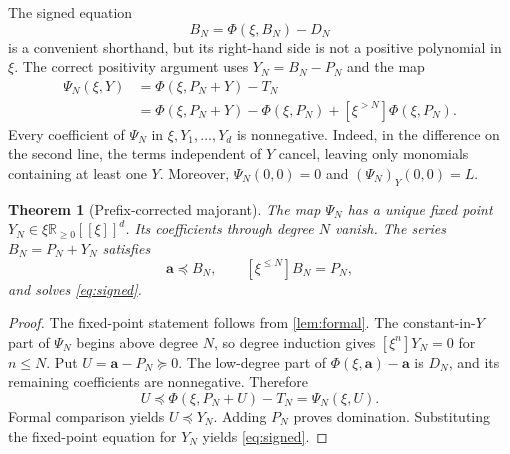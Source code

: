 \documentclass[11pt,a4paper]{article}
\newtheorem{theorem}{Theorem}[section]
\theoremstyle{definition}
\theoremstyle{remark}
\newcommand{\R}{\mathbb R}
\newcommand{\bA}{\boldsymbol a}
\newcommand{\trunc}[2]{[\xi^{\leq #1}]#2}
\newcommand{\tail}[2]{[\xi^{>#1}]#2}
\begin{document}
The signed equation
\begin{equation}\label{eq:signed}
 B_N=\Phi(\xi,B_N)-D_N
\end{equation}
is a convenient shorthand, but its right-hand side is not a positive
polynomial in $\xi$. The correct positivity argument uses $Y_N=B_N-P_N$
and the map
\begin{equation}\label{eq:psi}
\begin{split}
 \Psi_N(\xi,Y)
 &=\Phi(\xi,P_N+Y)-T_N\\
 &=\Phi(\xi,P_N+Y)-\Phi(\xi,P_N)
   +\tail{N}{\Phi(\xi,P_N)}.
\end{split}
\end{equation}
Every coefficient of $\Psi_N$ in $\xi,Y_1,\ldots,Y_d$ is nonnegative.
Indeed, in the difference on the second line, the terms independent of $Y$
cancel, leaving only monomials containing at least one $Y$.
Moreover, $\Psi_N(0,0)=0$ and $(\Psi_N)_Y(0,0)=L$.

\begin{theorem}[Prefix-corrected majorant]\label{thm:majorant}
The map $\Psi_N$ has a unique fixed point
$Y_N\in\xi\R_{\geq0}[[\xi]]^d$. Its coefficients through degree $N$ vanish.
The series $B_N=P_N+Y_N$ satisfies
\[
 \bA\preceq B_N,\qquad
 \trunc{N}{B_N}=P_N,
\]
and solves \eqref{eq:signed}.
\end{theorem}
\begin{proof}
The fixed-point statement follows from \cref{lem:formal}. The constant-in-$Y$
part of $\Psi_N$ begins above degree $N$, so degree induction gives
$[\xi^n]Y_N=0$ for $n\leq N$.
Put $U=\bA-P_N\succeq0$. The low-degree part of
$\Phi(\xi,\bA)-\bA$ is $D_N$, and its remaining coefficients are
nonnegative. Therefore
\[
 U\preceq\Phi(\xi,P_N+U)-T_N=\Psi_N(\xi,U).
\]
Formal comparison yields $U\preceq Y_N$. Adding $P_N$ proves domination.
Substituting the fixed-point equation for $Y_N$ yields \eqref{eq:signed}.
\end{proof}
\end{document}
